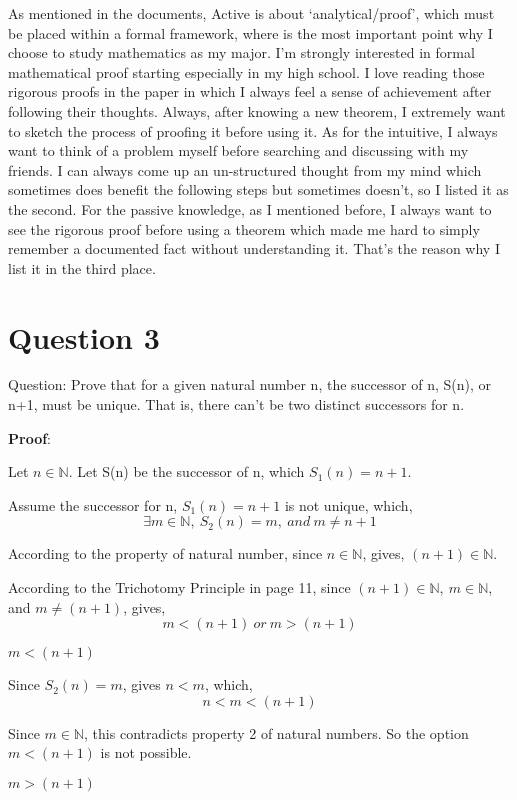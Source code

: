 \documentclass[12pt]{article}
\begin{document}
\noindent As mentioned in the documents, Active is about `analytical/proof', which must be placed within a formal framework, where is the most important point why I choose to study mathematics as my major. I'm strongly interested in formal mathematical proof starting especially in my high school. I love reading those rigorous proofs in the paper in which I always feel a sense of achievement after following their thoughts. Always, after knowing a new theorem, I extremely want to sketch the process of proofing it before using it. As for the intuitive, I always want to think of a problem myself before searching and discussing with my friends. I can always come up an un-structured thought from my mind which sometimes does benefit the following steps but sometimes doesn't, so I listed it as the second. For the passive knowledge, as I mentioned before, I always want to see the rigorous proof before using a theorem which made me hard to simply remember a documented fact without understanding it. That’s the reason why I list it in the third place.

\newpage

\section{Question 3}
Question: Prove that for a given natural number n, the successor of n, S(n), or n+1, must be unique. That is, there can't be two distinct successors for n.

\noindent \textbf{Proof}: 

\noindent Let $n \in \mathbb{N}$. Let S(n) be the successor of n, which $S_1(n) = n+1$.

\noindent Assume the successor for n, $S_1(n)=n+1$ is not unique, which, $$\exists m \in \mathbb{N},\ S_2(n)=m,\ and\ m\neq n+1$$

\noindent According to the property of natural number, since $n \in \mathbb{N}$, gives, $(n + 1) \in \mathbb{N}$.

\noindent According to the Trichotomy Principle in page 11, since $(n+1)\in \mathbb{N},\ m \in \mathbb{N}$, and $m\neq (n+1)$, gives, 
$$m < (n+1)\ or\ m > (n+1)$$

 $m < (n+1)$

Since $S_2(n)=m$, gives $n < m$, which,
$$n<m<(n+1)$$

Since $m \in \mathbb{N}$, this contradicts property 2 of natural numbers. So the option $m < (n+1)$ is not possible.

 $m > (n+1)$
\end{document}

